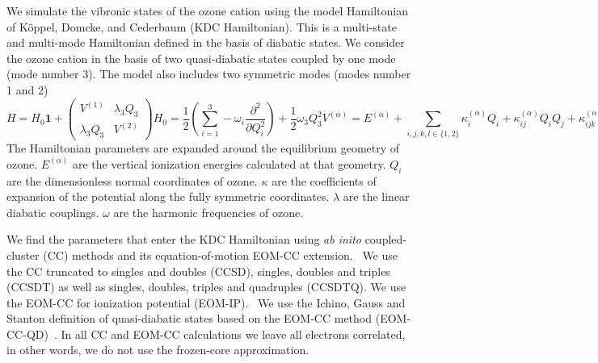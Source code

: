 \documentclass[12pt,a4paper,prb,aps,superscriptaddress]{revtex4}
\begin{document}
We simulate the vibronic states of the ozone cation using the model
Hamiltonian of K{\"o}ppel, Domcke, and Cederbaum (KDC
Hamiltonian).\cite{Cederbaum:LVC:84,KDC:81,Koppel:CIbookCh7:04} This is a
multi-state and multi-mode Hamiltonian defined in the basis of diabatic
states.  We consider the ozone cation in the basis of two quasi-diabatic
states coupled by one mode (mode number 3). The model also includes two
symmetric modes (modes number 1 and 2)
\begin{subequations}
    \begin{equation}
        H = H _0 \mathbf{1}
        +
        \begin{pmatrix}
            V ^{(1)}  & \lambda _3 Q _3\\
            \lambda _3 Q _3 & V ^{(2)}
        \end{pmatrix}
    \end{equation}
    \begin{equation}
        H _0 = 
        \frac{1}{2} \left(\sum _{i = 1}^3 
        - \omega _i \frac{\partial ^2}{\partial Q _i ^2 }\right)
        + \frac{1}{2}\omega _3 Q _3 ^2
    \end{equation}
    \begin{equation}
        V ^{(\alpha)} = 
        E ^{(\alpha)} 
        + \sum _{i,j,k,l \in \{1,2\}} 
            \kappa ^{(\alpha)} _i Q _i 
            + \kappa ^{(\alpha)} _{ij} Q _i Q _j 
            + \kappa ^{(\alpha)} _{ijk} Q _i Q _j Q _k 
            + \kappa ^{(\alpha)} _{ijkl} Q_i Q _j Q _k Q _l.
    \end{equation}
    \label{eq:KDC}
\end{subequations}
The Hamiltonian parameters are expanded around the equilibrium geometry of
ozone. $E ^{(\alpha)}$ are the vertical ionization energies calculated at that
geometry. $Q_i$ are the dimensionless normal coordinates of ozone. $\kappa$ are
the coefficients of expansion of the potential along the fully symmetric
coordinates. $\lambda$ are the linear diabatic couplings.  $\omega$ are the
harmonic frequencies of ozone.

We find the parameters that enter the KDC Hamiltonian using \emph{ab inito}
coupled-cluster (CC) methods and its equation-of-motion EOM-CC
extension.~\cite{Bartlett:CC_review:07, Krylov:EOMRev:07, Bartlett:Book:09,
Christiansen:EOMRev:11, Bartlet:EOMRev:12, Krylov:OSRev} We use the CC
truncated to singles and doubles (CCSD), singles, doubles and triples (CCSDT)
as well as singles, doubles, triples and quadruples
(CCSDTQ).\cite{Matthews:ncc:2015}  We use the EOM-CC for ionization potential
(EOM-IP).~\cite{StantonGauss:EOMIP:99} We use the Ichino, Gauss and Stanton
definition of quasi-diabatic states based on the EOM-CC method
(EOM-CC-QD)~\cite{Stanton:EOMIPdeg:09}. In all CC and EOM-CC calculations we
leave all electrons correlated, in other words, we do not use the
frozen-core approximation.
\end{document}
